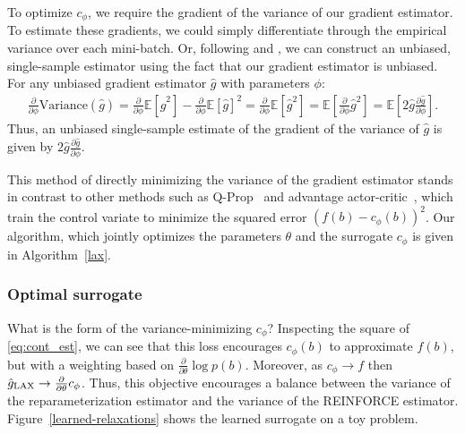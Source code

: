 \documentclass{article}
\newcommand{\E}{\mathbb{E}}
\newcommand{\PT}{\frac{\partial}{\partial \theta}}
\newcommand{\PPH}{\frac{\partial}{\partial \phi}}
\newcommand{\LAX}{{\textnormal{LAX}}}
\begin{document}
To optimize $c_\phi$, we require the gradient of the variance of our gradient estimator.
To estimate these gradients, we could simply differentiate through the empirical variance over each mini-batch.
Or, following \cite{ruiz2016overdispersed} and \cite{tucker2017rebar}, we can construct an unbiased, single-sample estimator using the fact that our gradient estimator is unbiased.
For any unbiased gradient estimator $\hat g$ with parameters $\phi$:
%
\begin{align}
\PPH \text{Variance}(\hat g)
= \PPH \E[\hat g^2] - \PPH \E[\hat g]^2
= \PPH \E[\hat g^2]
= \E \left[ \PPH \hat g^2 \right]
= \E \left[ 2 \hat g \frac{\partial \hat g}{\partial \phi} \right].
\label{eq:vargrad}
\end{align}  %
%
Thus, an unbiased single-sample estimate of the gradient of the variance of $\hat g$ is given by {$2 \hat g \frac{\partial \hat g}{\partial \phi}$}.

This method of directly minimizing the variance of the gradient estimator stands in contrast to other methods such as Q-Prop~\citep{gu2016q} and advantage actor-critic~\citep{sutton2000policy}, which train the control variate to minimize the squared error $(f(b) - c_\phi(b))^2$.
Our algorithm, which jointly optimizes the parameters $\theta$ and the surrogate $c_\phi$ is given in Algorithm~\ref{lax}.

\subsubsection{Optimal surrogate}
What is the form of the variance-minimizing $c_\phi$?
Inspecting the square of \eqref{eq:cont_est}, we can see that this loss encourages $c_\phi(b)$ to approximate $f(b)$, but with a weighting based on $\PT\log p(b)$.  %
Moreover, as $c_\phi \rightarrow f$ then $\hat g_\textnormal{\LAX} \rightarrow \PT c_\phi$.
Thus, this objective encourages a balance between the variance of the reparameterization estimator and the variance of the REINFORCE estimator.
Figure~\ref{learned-relaxations} shows the learned surrogate on a toy problem.
\end{document}

